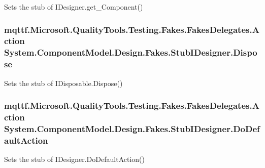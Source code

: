 Sets the stub of I\-Designer.\-get\-\_\-\-Component()

\hypertarget{class_system_1_1_component_model_1_1_design_1_1_fakes_1_1_stub_i_designer_a2a7c97bf85ad458edbc6245536c0fda6}{
\subsubsection[{Dispose}]{\setlength{\rightskip}{0pt plus 5cm}mqttf.\-Microsoft.\-Quality\-Tools.\-Testing.\-Fakes.\-Fakes\-Delegates.\-Action System.\-Component\-Model.\-Design.\-Fakes.\-Stub\-I\-Designer.\-Dispose}}\label{class_system_1_1_component_model_1_1_design_1_1_fakes_1_1_stub_i_designer_a2a7c97bf85ad458edbc6245536c0fda6}


Sets the stub of I\-Disposable.\-Dispose()

\hypertarget{class_system_1_1_component_model_1_1_design_1_1_fakes_1_1_stub_i_designer_a8f5af437f4f6ce4a686666be9e4f5024}{
\subsubsection[{Do\-Default\-Action}]{\setlength{\rightskip}{0pt plus 5cm}mqttf.\-Microsoft.\-Quality\-Tools.\-Testing.\-Fakes.\-Fakes\-Delegates.\-Action System.\-Component\-Model.\-Design.\-Fakes.\-Stub\-I\-Designer.\-Do\-Default\-Action}}\label{class_system_1_1_component_model_1_1_design_1_1_fakes_1_1_stub_i_designer_a8f5af437f4f6ce4a686666be9e4f5024}


Sets the stub of I\-Designer.\-Do\-Default\-Action()

